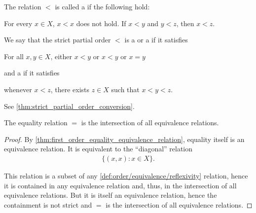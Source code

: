 \begin{definition}
\begin{defenum}
    \item\label{def:order/strict_partial}\cite[168]{Enderton1977} The relation \( < \) is called a  if the following hold:
    \begin{description}
       For every \( x \in X \), \( x < x \) does not hold.
       If \( x < y \) and \( y < z \), then \( x < z \).
    \end{description}

    We say that the strict partial order \( < \) is a  or a  if it satisfies
    \begin{description}
       For all \( x, y \in X \), either \( x < y \) or \( x < y \) or \( x = y \)
    \end{description}
    and a  if it satisfies
    \begin{description}
       whenever \( x < z \), there exists \( z \in X \) such that \( x < y < z \).
    \end{description}

    See \cref{thm:strict_partial_order_conversion}.
  \end{defenum}
\end{definition}

\begin{proposition}\label{thm:equality_is_smallest_equivalence_relation}
  The equality relation \( = \) is the intersection of all equivalence relations.
\end{proposition}
\begin{proof}
  By \cref{thm:first_order_equality_equivalence_relation}, equality itself is an equivalence relation. It is equivalent to the \enquote{diagonal} relation
  \begin{align*}
    \{ (x, x) \colon x \in X \}.
  \end{align*}

  This relation is a subset of any \ref{def:order/equivalence/reflexivity} relation, hence it is contained in any equivalence relation and, thus, in the intersection of all equivalence relations. But it is itself an equivalence relation, hence the containment is not strict and \( = \) is the intersection of all equivalence relations.
\end{proof}

